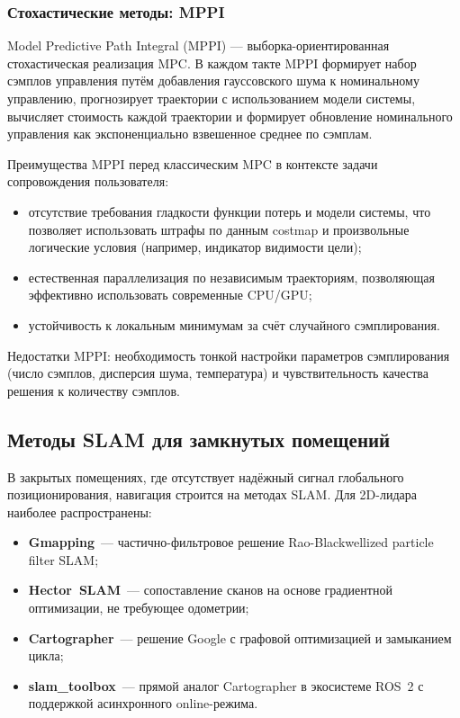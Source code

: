 \subsubsection{Стохастические методы: MPPI}

Model Predictive Path Integral (MPPI) --- выборка-ориентированная
стохастическая реализация MPC. В каждом такте MPPI формирует набор
сэмплов управления путём добавления гауссовского шума к номинальному
управлению, прогнозирует траектории с использованием модели системы,
вычисляет стоимость каждой траектории и формирует обновление
номинального управления как экспоненциально взвешенное среднее по
сэмплам.

Преимущества MPPI перед классическим MPC в контексте задачи
сопровождения пользователя:
\begin{itemize}
    \item отсутствие требования гладкости функции потерь и модели
          системы, что позволяет использовать штрафы по данным costmap и
          произвольные логические условия (например, индикатор видимости
          цели);
    \item естественная параллелизация по независимым траекториям,
          позволяющая эффективно использовать современные CPU/GPU;
    \item устойчивость к локальным минимумам за счёт случайного
          сэмплирования.
\end{itemize}

Недостатки MPPI: необходимость тонкой настройки параметров
сэмплирования (число сэмплов, дисперсия шума, температура) и
чувствительность качества решения к количеству сэмплов.

\subsection{Методы SLAM для замкнутых помещений}

В закрытых помещениях, где отсутствует надёжный сигнал глобального
позиционирования, навигация строится на методах SLAM. Для 2D-лидара
наиболее распространены:
\begin{itemize}
    \item \textbf{Gmapping}~--- частично-фильтровое решение Rao-Blackwellized
          particle filter SLAM;
    \item \textbf{Hector~SLAM}~--- сопоставление сканов на основе
          градиентной оптимизации, не требующее одометрии;
    \item \textbf{Cartographer}~--- решение Google с графовой оптимизацией
          и замыканием цикла;
    \item \textbf{slam\_toolbox}~--- прямой аналог Cartographer в
          экосистеме ROS~2 с поддержкой асинхронного online-режима.
\end{itemize}

